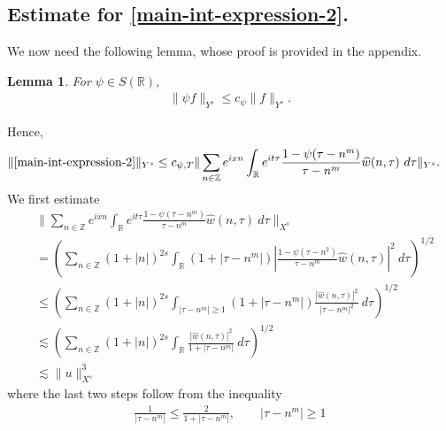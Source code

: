 \documentclass[12pt,reqno]{amsart}
\numberwithin{equation}{section}  %
\numberwithin{figure}{section}
\newcommand{\rr}{\mathbb{R}}
\newcommand{\zz}{\mathbb{Z}}
\newcommand{\wh}{\widehat}
\theoremstyle{plain}
\newtheorem{lemma}{Lemma}
\theoremstyle{definition}
\theoremstyle{remark}
\begin{document}
\subsection{Estimate for \eqref{main-int-expression-2}.}
We now need the following lemma, whose proof is provided in the appendix.
%
%
%
%
%
%
%
%
\begin{lemma}
\label{lem:schwartz-mult}
	For $\psi \in S(\rr)$,
%
%
\begin{equation}
	\label{schwartz-mult}
	\begin{split}
		\|\psi f \|_{Y^s} \le c_{\psi} \|f \|_{Y^s}.
	\end{split}
\end{equation}
%
%
\end{lemma}
%
%
Hence,
%
%
\begin{equation}
  \label{yu}
	\begin{split}
		\|\eqref{main-int-expression-2}\|_{Y^s} 
    & \le c_{\psi, T}
		\| \sum_{n \in \zz} e^{ixn} \int_\rr 
		e^{it \tau} \frac{ 1 - \psi (\tau - n^{m} ) 
		}{\tau - n^{m}} \wh{w}(n, \tau) \ 
		d \tau\|_{Y^s}.
			\end{split}
\end{equation}
%
We first estimate
%
%
\begin{equation}
\label{main-int2-est-X-s-part}
\begin{split}
  & \| \sum_{n \in \zz} e^{ixn} \int_\rr 
		e^{it \tau} \frac{ 1 - \psi (\tau - n^{m} ) 
		}{\tau - n^{m}} \wh{w}(n, \tau) \ 
		d \tau\|_{X^s}
		\\
    & = \left( \sum_{n \in \zz} \left (1 + |n| \right )^{2s} \int_\rr
		(1 + |\tau - n^{m}|) \left | \frac{1 - \psi(\tau - n^{2 
		})}{\tau - n^{m}} 
		\wh{w}(n, \tau) \right |^2 \ d 
		\tau \right)^{1/2}
		\\
		& \le \left( \sum_{n \in \zz} \left (1 + |n| \right )^{2s} \int_{| \tau - n^{m }| \ge 1}
		(1 + |\tau - n^{m}|) \frac{|\wh{w}(n, \tau)|^2 }{|\tau - n^{m }|^2} 
		\ d 
		\tau \right)^{1/2}
		\\
		& \lesssim  \left( \sum_{n \in 
		\zz} \left (1 + |n| \right )^{2s} \int_\rr
		\frac{|\wh{w}(n, \tau) |^2}{1+ |\tau - 
		n^{m}|} 
		 \ d \tau 
		\right)^{1/2}
		\\
		& \lesssim  \|u\|_{X^s}^3
\end{split}
\end{equation}
%
%
%
where the last two steps follow from the inequality 
%
\begin{equation}
	\label{one-plus-ineq}
	\begin{split}
		\frac{1}{|\tau - n^{m}| } \le \frac{2}{1 + |\tau - n^{m}| }, 
		\qquad |\tau - n^{m}| \ge 1
	\end{split}
\end{equation}
\end{document}
